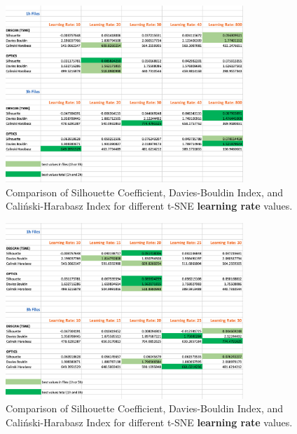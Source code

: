 \begin{figure}[H]
  \centering
  \includegraphics[width=0.8\textwidth]{./images/tsneParametersTest/learningRate/learningRateEvaluationScoresAverageDetailed2.png}
  \caption{Comparison of Silhouette Coefficient, Davies-Bouldin Index, and Caliński-Harabasz Index for different t-SNE \textbf{learning rate} values.}
  \label{figure:learningRateEvaluationScoresAverageDetailed2}
\end{figure}

\begin{figure}[H]
  \centering
  \includegraphics[width=0.8\textwidth]{./images/tsneParametersTest/learningRate/learningRateEvaluationScoresAverageDetailed3.png}
  \caption{Comparison of Silhouette Coefficient, Davies-Bouldin Index, and Caliński-Harabasz Index for different t-SNE \textbf{learning rate} values.}
  \label{figure:learningRateEvaluationScoresAverageDetailed3}
\end{figure}






